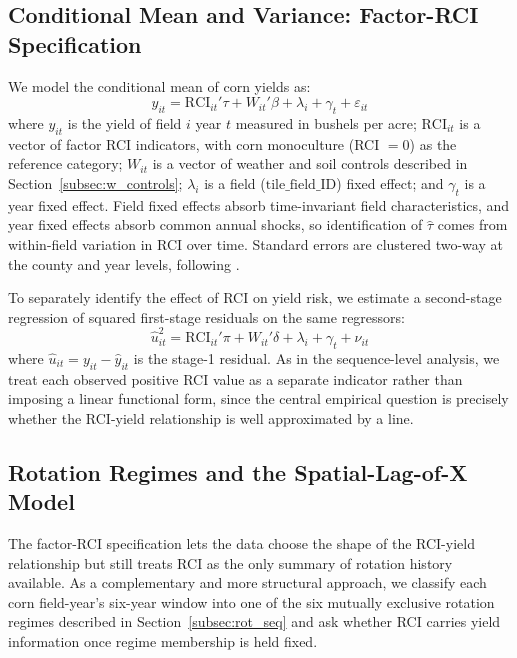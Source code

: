 \documentclass[12pt,letterpaper]{article}
\theoremstyle{remark}
\theoremstyle{remark}
\theoremstyle{plain}
\theoremstyle{definition}
\begin{document}
\subsection{\label{subsec:stage_1}Conditional Mean and Variance: Factor-RCI Specification}
We model the conditional mean of corn yields as:
\begin{equation}
    y_{it}=\text{RCI}_{it}'\tau+ W_{it}'\beta+\lambda_{i}+\gamma_{t}+\varepsilon_{it}\label{eq:stage1}
\end{equation}
where $y_{it}$ is the yield of field $i$ year $t$ measured in bushels per acre; $\text{RCI}_{it}$ is a vector of factor RCI indicators, with corn monoculture (RCI $=0$) as the reference category; $W_{it}$ is a vector of weather and soil controls described in Section~\ref{subsec:w_controls}; $\lambda_{i}$ is a field ($\text{tile\_field\_ID}$) fixed effect; and $\gamma_{t}$ is a year fixed effect. Field fixed effects absorb time-invariant field characteristics, and year fixed effects absorb common annual shocks, so identification of $\hat{\tau}$ comes from within-field variation in RCI over time. Standard errors are clustered two-way at the county and year levels, following \cite{Cameron2015}.

To separately identify the effect of RCI on yield risk, we estimate a second-stage regression of squared first-stage residuals on the same regressors:
\begin{equation}
    \hat{u}_{it}^2 = \text{RCI}_{it}'\pi + W_{it}'\delta + \lambda_i + \gamma_t + \nu_{it}\label{eq:stage2}
\end{equation}
where $\hat{u}_{it} = y_{it}-\hat{y}_{it}$ is the stage-1 residual. As in the sequence-level analysis, we treat each observed positive RCI value as a separate indicator rather than imposing a linear functional form, since the central empirical question is precisely whether the RCI-yield relationship is well approximated by a line.

\subsection{\label{subsec:regimes_model}Rotation Regimes and the Spatial-Lag-of-X Model}
The factor-RCI specification lets the data choose the shape of the RCI-yield relationship but still treats RCI as the only summary of rotation history available. As a complementary and more structural approach, we classify each corn field-year's six-year window into one of the six mutually exclusive rotation regimes described in Section~\ref{subsec:rot_seq} and ask whether RCI carries yield information once regime membership is held fixed.
\end{document}
